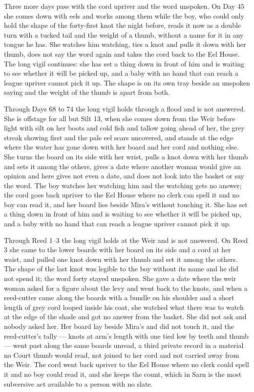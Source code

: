 \documentclass{design/chronicle}
\begin{document}
{Three more days pass with the cord upriver and the word unspoken. On Day 45 she comes down with eels and works among them while the boy, who could only hold the shape of the forty-first knot the night before, reads it now as a double turn with a tucked tail and the weight of a thumb, without a name for it in any tongue he has. She watches him watching, ties a knot and pulls it down with her thumb, does not say the word again and takes the cord back to the Eel House. The long vigil continues: she has set a thing down in front of him and is waiting to see whether it will be picked up, and a baby with no hand that can reach a league upriver cannot pick it up. The shape is on its own tray beside an unspoken saying and the weight of the thumb is apart from both.

Through Days 68 to 74 the long vigil holds through a flood and is not answered. She is offstage for all but Silt 13, when she comes down from the Weir before light with silt on her boots and cold fish and tallow going ahead of her, the grey streak showing first and the pale eel scars uncovered, and stands at the edge where the water has gone down with her board and her cord and nothing else. She turns the board on its side with her wrist, pulls a knot down with her thumb and sets it among the others, gives a date where another woman would give an opinion and here gives not even a date, and does not look into the basket or say the word. The boy watches her watching him and the watching gets no answer; the cord goes back upriver to the Eel House where no clerk can spell it and no boy can read it, and her board lies beside Mira’s without touching it. She has set a thing down in front of him and is waiting to see whether it will be picked up, and a baby with no hand that can reach a league upriver cannot pick it up.

Through Reed 1–3 the long vigil holds at the Weir and is not answered. On Reed 3 she came to the lower boards with her board on its side and a cord at her waist, and pulled one knot down with her thumb and set it among the others. The shape of the last knot was legible to the boy without its name and he did not spend it; the word forty stayed unspoken. She gave a date where the weir woman asked for a figure about the levy and went back to the knots, and when a reed-cutter came along the boards with a bundle on his shoulder and a short length of grey cord looped inside his coat, she watched what there was to watch at the edge of the shade and got no answer from the basket. She did not ask and nobody asked her. Her board lay beside Mira’s and did not touch it, and the reed-cutter’s tally — knots at arm’s length with one tied low by teeth and thumb — went past along the same boards unread, a third private record in a material no Court thumb would read, not joined to her cord and not carried away from the Weir. The cord went back upriver to the Eel House where no clerk could spell it and no boy could read it, and she keeps the count, which in Sarn is the most subversive act available to a person with no slate.

}
\end{document}
